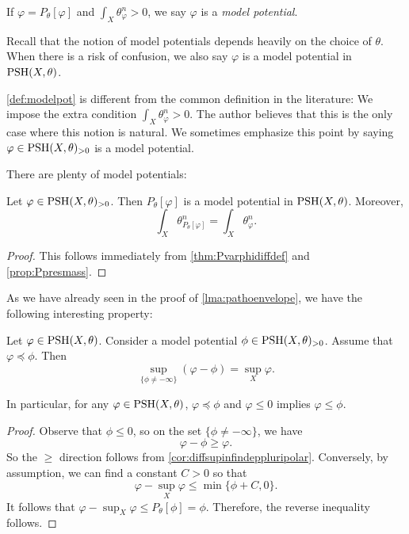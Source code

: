 \begin{definition}\label{def:modelpot}
    If $\varphi=P_{\theta}[\varphi]$ and $\int_X \theta_{\varphi}^n>0$, we say $\varphi$ is a \emph{model potential}.
\end{definition}
Recall that the notion of model potentials depends heavily on the choice of $\theta$. When there is a risk of confusion, we also say $\varphi$ is a model potential in $\mathrm{PSH}(X,\theta)$.

\begin{remark}\label{rmk:envelopes:L267}
\cref{def:modelpot} is different from the common definition in the literature: We impose the extra condition $\int_X \theta_{\varphi}^n>0$. The author believes that this is the only case where this notion is natural. We sometimes emphasize this point by saying $\varphi\in \mathrm{PSH}(X,\theta)_{>0}$ is a model potential.
\end{remark}

There are plenty of model potentials:
\begin{corollary}\label{cor:Psendspotentialtomodel}
    Let $\varphi\in \mathrm{PSH}(X,\theta)_{>0}$. Then $P_{\theta}[\varphi]$ is a model potential in $\mathrm{PSH}(X,\theta)$. Moreover,
    \[
        \int_X \theta_{P_{\theta}[\varphi]}^n=\int_X \theta_{\varphi}^n.
    \]
\end{corollary}
\begin{proof}
    This follows immediately from \cref{thm:Pvarphidiffdef} and \cref{prop:Ppresmass}.
\end{proof}

As we have already seen in the proof of \cref{lma:pathoenvelope}, we have the following interesting property:
\begin{proposition}\label{prop:model_sup_prop}
    Let $\varphi\in \mathrm{PSH}(X,\theta)$. Consider a model potential $\phi\in \mathrm{PSH}(X,\theta)_{>0}$. Assume that $\varphi\preceq \phi$. Then
    \[
    \sup_{\{\phi\neq -\infty\}} (\varphi-\phi)=\sup_X \varphi.
    \]
\end{proposition}
In particular, for any $\varphi\in \mathrm{PSH}(X,\theta)$, $\varphi\preceq \phi$ and $\varphi\leq 0$ implies $\varphi\leq \phi$.

\begin{proof}
    Observe that $\phi\leq 0$, so on the set $\{\phi\neq -\infty\}$, we have
    \[
    \varphi-\phi\geq \varphi.
    \]
    So the $\geq$ direction follows from \cref{cor:diffsupinfindeppluripolar}.
    Conversely, by assumption, we can find a constant $C>0$ so that
    \[
    \varphi-\sup_X \varphi\leq \min\{\phi+C,0 \}.
    \]
    It follows that $\varphi-\sup_X \varphi\leq P_{\theta}[\phi]=\phi$. Therefore, the reverse inequality follows.
\end{proof}



